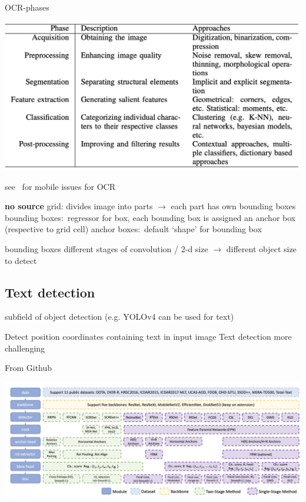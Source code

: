 OCR-phases~\cite{sourvanos_challenges_2018}

\includegraphics[width=\textwidth]{img/OCR-Phases.png}

see~\cite{sourvanos_challenges_2018} for mobile issues for \ac{OCR}

\textbf{no source}
grid: divides image into parts $\rightarrow$ each part has own bounding boxes
bounding boxes:~regressor for box, each bounding box is assigned an anchor box (respective to grid cell)
anchor boxes:~default `shape' for bounding box

bounding boxes different stages of convolution / 2-d size $\rightarrow$ different object size to detect

\subsection*{Text detection}
subfield of object detection (e.g. YOLOv4 can be used for text)

Detect position coordinates containing text in input image
Text detection more challenging

From Github~\citep{noauthor_yangxue0827rotationdetection_nodate}

\includegraphics[width=\textwidth]{img/Detection-Modules.png}

